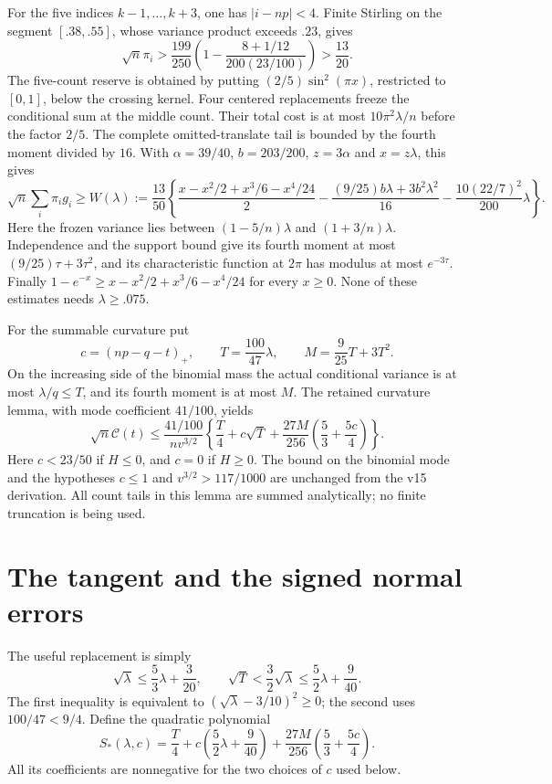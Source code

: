 \documentclass[11pt,a4paper]{article}
\begin{document}
For the five indices $k-1,\ldots,k+3$, one has $|i-np|<4$.
Finite Stirling on the segment $[.38,.55]$, whose variance product exceeds
$.23$, gives
\[
 \sqrt n\pi_i>
 \frac{199}{250}\left(1-\frac{8+1/12}{200(23/100)}\right)>
 \frac{13}{20}.
\]
The five-count reserve is obtained by putting $(2/5)\sin^2(\pi x)$,
restricted to $[0,1]$, below the crossing kernel. Four centered replacements
freeze the conditional sum at the middle count. Their total cost is at most
$10\pi^2\lambda/n$ before the factor $2/5$. The complete omitted-translate
tail is bounded by the fourth moment divided by $16$.
With $\alpha=39/40$, $b=203/200$, $z=3\alpha$ and $x=z\lambda$, this gives
\begin{equation}\label{eq:W}
 \sqrt n\sum_i\pi_i g_i\ge W(\lambda):=
 \frac{13}{50}\left\{
 \frac{x-x^2/2+x^3/6-x^4/24}{2}
 -\frac{(9/25)b\lambda+3b^2\lambda^2}{16}
 -\frac{10(22/7)^2}{200}\lambda\right\}.
\end{equation}
Here the frozen variance lies between $(1-5/n)\lambda$ and
$(1+3/n)\lambda$. Independence and the support bound give its fourth
moment at most $(9/25)\tau+3\tau^2$, and its characteristic function at
$2\pi$ has modulus at most $e^{-3\tau}$. Finally
$1-e^{-x}\ge x-x^2/2+x^3/6-x^4/24$ for every $x\ge0$.
None of these estimates needs $\lambda\ge.075$.

For the summable curvature put
\[
 c=(np-q-t)_+,\qquad T=\frac{100}{47}\lambda,\qquad
 M=\frac9{25}T+3T^2.
\]
On the increasing side of the binomial mass the actual conditional variance
is at most $\lambda/q\le T$, and its fourth moment is at most $M$.
The retained curvature lemma, with mode coefficient $41/100$, yields
\begin{equation}\label{eq:curvature}
 \sqrt n\mathcal C(t)\le
 \frac{41/100}{nv^{3/2}}
 \left\{\frac T4+c\sqrt T+
 \frac{27M}{256}\left(\frac53+\frac{5c}{4}\right)\right\}.
\end{equation}
Here $c<23/50$ if $H\le0$, and $c=0$ if $H\ge0$.
The bound on the binomial mode and the hypotheses $c\le1$ and $v^{3/2}>117/1000$
are unchanged from the v15 derivation. All count tails in this lemma are
summed analytically; no finite truncation is being used.

\section{The tangent and the signed normal errors}
The useful replacement is simply
\begin{equation}\label{eq:tangent}
 \sqrt\lambda\le\frac53\lambda+\frac3{20},\qquad
 \sqrt T<\frac32\sqrt\lambda\le\frac52\lambda+\frac9{40}.
\end{equation}
The first inequality is equivalent to
$(\sqrt\lambda-3/10)^2\ge0$; the second uses $100/47<9/4$.
Define the quadratic polynomial
\[
 S_*(\lambda,c)=\frac T4+c\left(\frac52\lambda+\frac9{40}\right)
        +\frac{27M}{256}\left(\frac53+\frac{5c}{4}\right).
\]
All its coefficients are nonnegative for the two choices of $c$ used below.
\end{document}
